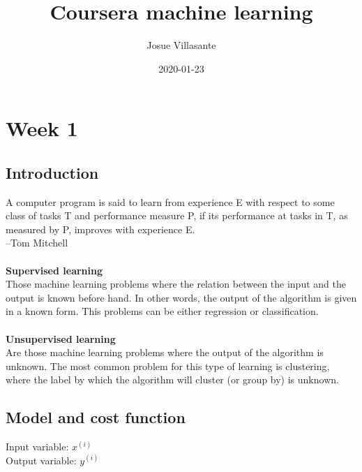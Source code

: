 \documentclass{article}
\title{Coursera machine learning}
\date{2020-01-23}
\author{Josue Villasante}
\begin{document}
  \maketitle
  \newpage

  \section{Week 1}
    \subsection{Introduction}
      A computer program is said to learn from experience E with respect to some class of tasks T and performance measure P, if its performance at tasks in T, as measured by P, improves with experience E.
      \\--Tom Mitchell\\\\
      {\large\bfseries Supervised learning}\\
      Those machine learning problems where the relation between the input and the output is known before hand. In other words, the output of the algorithm is given in a known form. This problems can be either regression or classification.\\\\
      {\large\bfseries Unsupervised learning}\\
      Are those machine learning problems where the output of the algorithm is unknown. The most common problem for this type of learning is clustering, where the label by which the algorithm will cluster (or group by) is unknown.
    \subsection{Model and cost function}
      \begin{center}
	      Input variable: $x^{(i)}$\\
	      Output variable: $y^{(i)}$
      \end{center}
\end{document}
